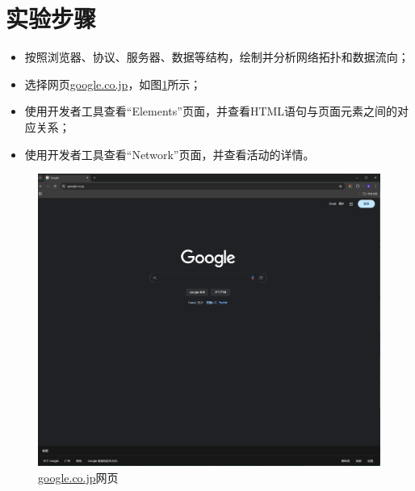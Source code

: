 \section{实验步骤}
\begin{itemize}
    \item 按照浏览器、协议、服务器、数据等结构，绘制并分析网络拓扑和数据流向；
    \item 选择网页\url{google.co.jp}，如图\ref{page}所示；
    \item 使用开发者工具查看“Elements”页面，并查看HTML语句与页面元素之间的对应关系；
    \item 使用开发者工具查看“Network”页面，并查看活动的详情。
\end{itemize}
\begin{figure}[!htbp]
    \centering
    \includegraphics[width=\textwidth]{figures/page.png}
    \caption{\url{google.co.jp}网页}\label{page}
\end{figure}
